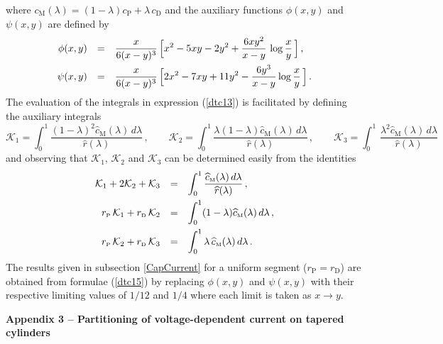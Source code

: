 where $c_\mathrm{M}(\lambda)=(1-\lambda)c_\mathrm{P}+\lambda\,
c_\mathrm{D}$ and the auxiliary functions $\phi(x,y)$ and
$\psi(x,y)$ are defined by
\begin{equation}\label{dtc16}
\begin{array}{rcl}
\phi(x,y) & = & \displaystyle\frac{x}{6(x-y)^3}\,\Big[x^2-5xy-2y^2
+\frac{6xy^2}{x-y}\,\log\frac{x}{y}\,\Big]\,,\\[10pt]
\psi(x,y) & = & \displaystyle\frac{x}{6(x-y)^3}\,\Big[2x^2-7xy+11y^2
-\frac{6y^3}{x-y}\log\frac{x}{y}\,\Big]\,.
\end{array}
\end{equation}
The evaluation of the integrals in expression (\ref{dtc13}) is
facilitated by defining the auxiliary integrals
\[
\mathcal{K}_1= \int_0^1\frac{(1-\lambda)^2
\widehat{c}_\mathrm{M}(\lambda)\,d\lambda}
{\widehat{r}(\lambda)}\,,\qquad \mathcal{K}_2=\int_0^1
\frac{\lambda(1-\lambda)\widehat{c}_\mathrm{M}(\lambda)\,d\lambda}
{\widehat{r}(\lambda)}\,,\qquad
\mathcal{K}_3=\int_0^1\,\frac{\lambda^2\widehat{c}_\mathrm{M}(\lambda)\,d\lambda}
{\widehat{r}(\lambda)}
\]
and observing that $\mathcal{K}_1$, $\mathcal{K}_2$ and
$\mathcal{K}_3$ can be determined easily from the identities
\[
\begin{array}{rcl}
\mathcal{K}_1+2\mathcal{K}_2+\mathcal{K}_3 & = & \displaystyle\int_0^1\frac{\widehat{c}_{\mbox{\tiny M}}(\lambda)\,d\lambda}{\widehat{r}(\lambda)}\,,\\[10pt]
r_{\mbox{\tiny P}}\,\mathcal{K}_1+r_{\mbox{\tiny D}}\,\mathcal{K}_2 & = &
\displaystyle\int_0^1 (1-\lambda)\widehat{c}_{\mbox{\tiny M}}(\lambda)\,d\lambda\,,\\[10pt]
r_{\mbox{\tiny P}}\,\mathcal{K}_2+r_{\mbox{\tiny D}}\,\mathcal{K}_3 & = & \displaystyle\int_0^1
\lambda\,\widehat{c}_{\mbox{\tiny M}}(\lambda)\,d\lambda\,.
\end{array}
\]
The results given in subsection \ref{CapCurrent} for a uniform
segment ($r_\mathrm{P}=r_\mathrm{D}$) are obtained from formulae
(\ref{dtc15}) by replacing $\phi(x,y)$ and $\psi(x,y)$ with their
respective limiting values of $1/12$ and $1/4$ where each limit is
taken as $x\to y$.

\pagebreak[4]

\textbf{Appendix 3 -- Partitioning of voltage-dependent current on
tapered cylinders}

